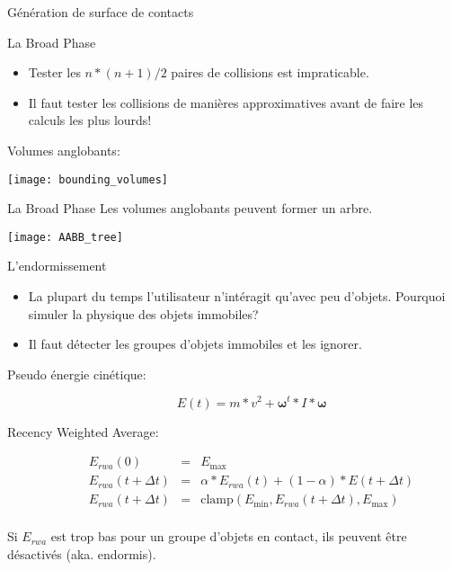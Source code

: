 \begin{frame}{Génération de surface de contacts}
\end{frame}

\begin{frame}{La Broad Phase}
    \begin{itemize}
        \item Tester les $n * (n + 1) / 2$ paires de collisions est impraticable.
        \item Il faut tester les collisions de manières approximatives avant de
            faire les calculs les plus lourds!
    \end{itemize}
    \pause
    \begin{description}
        \item[Volumes anglobants:]
    \end{description}
    \begin{center}
        \texttt{[image: bounding\_volumes]}
    \end{center}
\end{frame}

\begin{frame}{La Broad Phase}
    Les volumes anglobants peuvent former un arbre.
    \begin{center}
            \texttt{[image: AABB\_tree]}
    \end{center}
\end{frame}

\begin{frame}{L'endormissement}
    \begin{itemize}
        \item La plupart du temps l’utilisateur n’intéragit qu’avec
            peu d’objets. Pourquoi simuler la physique des objets immobiles?
        \pause
        \item Il faut détecter les groupes d’objets immobiles et les
            ignorer.
    \end{itemize}
        \pause
    \begin{description}
        \item[Pseudo énergie cinétique:]\mbox{}
            \[
                E(t) = m * v^2 + \boldsymbol\omega^t * I * \boldsymbol\omega
            \]
        \pause
    \item[Recency Weighted Average:]\mbox{}
        \[
            \begin{array}{lcl}
                E_{rwa}(0) & = & E_{\text{max}}\\
                E_{rwa}(t + \Delta t) & = & \alpha * E_{rwa}(t) + (1 - \alpha) * E(t + \Delta t)\\
                E_{rwa}(t + \Delta t) & = & \text{clamp}(E_{\text{min}}, E_{rwa}(t + \Delta t), E_{\text{max}})\\
            \end{array}
        \]
    \end{description}
    \pause
    Si $E_{rwa}$ est trop bas pour un groupe d’objets en contact, ils peuvent
    être désactivés (aka. endormis).
\end{frame}
